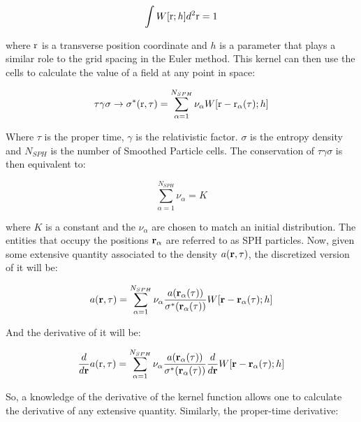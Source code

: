 \begin{equation}
\int W [\mathbf{\rm r};h]d^2 \mathbf{\rm r} = 1
\end{equation}

where $\textbf{\rm r}$ is a transverse position coordinate and $h$ is a parameter that plays a similar role to the grid spacing in the Euler method. This kernel can then use the cells to calculate the value of a field at any point in space:

\begin{equation}
\tau \gamma \sigma \rightarrow \sigma^* (\mathbf{\rm r}, \tau) = \sum_{\alpha=1}^{N_{SPH}} \nu_\alpha W [ \mathbf{\rm r} - \mathbf{\rm r}_\alpha(\tau);h]
\end{equation}

Where $\tau$ is the proper time, $\gamma$ is the relativistic factor. $\sigma$ is the entropy density and $N_{SPH}$ is the number of Smoothed Particle cells. The conservation of $\tau \gamma \sigma$ is then equivalent to:

\begin{equation}
\sum_{\alpha=1}^{N_{SPH}} \nu_\alpha = K
\end{equation}

where $K$ is a constant and the $\nu_\alpha$ are chosen to match an initial distribution. The entities that occupy the positions $\boldsymbol{\rm r}_{\alpha}$ are referred to as SPH particles. Now, given some extensive quantity associated to the density $a(\boldsymbol{\rm r},\tau)$, the discretized version of it will be:

\begin{equation}
a(\boldsymbol{\rm r},\tau) = \sum_{\alpha=1}^{N_{SPH}} \nu_{\alpha} \frac{a(\boldsymbol{\rm r}_{\alpha} (\tau))}{\sigma^*(\boldsymbol{\rm r}_{\alpha} (\tau))} W [ \boldsymbol{\rm r} - \boldsymbol{\rm r}_\alpha(\tau);h]
\end{equation}

And the derivative of it will be:

\begin{equation}
\frac{d}{d\boldsymbol{\rm r}} a(\mathbf{\rm r},\tau) = \sum_{\alpha=1}^{N_{SPH}} \nu_{\alpha} \frac{a(\boldsymbol{\rm r}_\alpha (\tau))}{\sigma^*(\boldsymbol{\rm r}_\alpha (\tau))} \frac{d}{d\boldsymbol{\rm r}} W [ \boldsymbol{\rm r} - \boldsymbol{\rm r}_\alpha(\tau);h]
\end{equation}

So, a knowledge of the derivative of the kernel function allows one to calculate the derivative of any extensive quantity. Similarly, the proper-time derivative:

